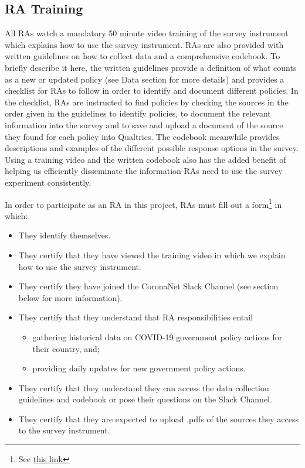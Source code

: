 \documentclass[]{article}
\providecommand{\tightlist}{%
  \setlength{\itemsep}{0pt}\setlength{\parskip}{0pt}}
\let\rmarkdownfootnote\footnote%
\def\footnote{\protect\rmarkdownfootnote}
\begin{document}
\hypertarget{ra-training}{%
\subsection{RA Training}\label{ra-training}}

All RAs watch a mandatory 50 minute video training of the survey instrument which explains how to use the survey instrument. RAs are also provided with written guidelines on how to collect data and a comprehensive codebook. To briefly describe it here, the written guidelines provide a definition of what counts as a new or updated policy (see Data section for more details) and provides a checklist for RAs to follow in order to identify and document different policies. In the checklist, RAs are instructed to find policies by checking the sources in the order given in the guidelines to identify policies, to document the relevant information into the survey and to save and upload a document of the source they found for each policy into Qualtrics. The codebook meanwhile provides descriptions and examples of the different possible response options in the survey. Using a training video and the written codebook also has the added benefit of helping us efficiently disseminate the information RAs need to use the survey experiment consistently.

In order to participate as an RA in this project, RAs must fill out a form\footnote{See \href{https://docs.google.com/forms/d/e/1FAIpQLSeybAW0DC0UE1x2EqLiTifVFuSUxqJLGFB8VI4wVCG61tVYKg/viewform}{this link} } in which:

\begin{itemize}
\tightlist
\item
  They identify themselves.
\item
  They certify that they have viewed the training video in which we explain how to use the survey instrument.
\item
  They certify they have joined the CoronaNet Slack Channel (see section below for more information).
\item
  They certify that they understand that RA responsibilities entail

  \begin{itemize}
  \tightlist
  \item
    gathering historical data on COVID-19 government policy actions for their country, and;
  \item
    providing daily updates for new government policy actions.
  \end{itemize}
\item
  They certify that they understand they can access the data collection guidelines and codebook or pose their questions on the Slack Channel.
\item
  They certify that they are expected to upload .pdfs of the sources they access to the survey instrument.
\end{itemize}
\end{document}
